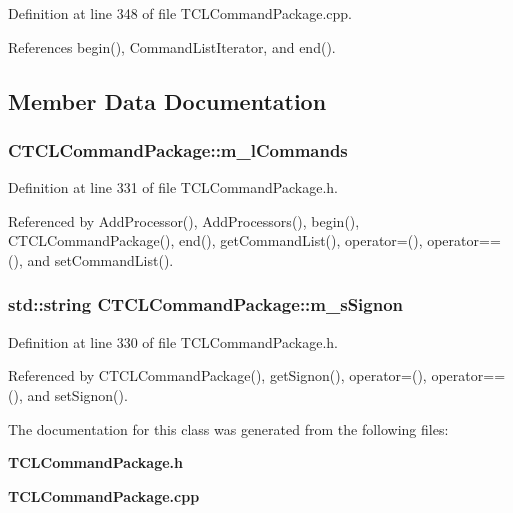 Definition at line 348 of file TCLCommand\-Package.cpp.

References begin(), Command\-List\-Iterator, and end().

\subsection{Member Data Documentation}
\subsubsection{ CTCLCommand\-Package::m\_\-l\-Commands\hspace{0.3cm}{\tt  [private]}}\label{classCTCLCommandPackage_o1}




Definition at line 331 of file TCLCommand\-Package.h.

Referenced by Add\-Processor(), Add\-Processors(), begin(), CTCLCommand\-Package(), end(), get\-Command\-List(), operator=(), operator==(), and set\-Command\-List().
\subsubsection{\setlength{\rightskip}{0pt plus 5cm}std::string CTCLCommand\-Package::m\_\-s\-Signon\hspace{0.3cm}{\tt  [private]}}\label{classCTCLCommandPackage_o0}




Definition at line 330 of file TCLCommand\-Package.h.

Referenced by CTCLCommand\-Package(), get\-Signon(), operator=(), operator==(), and set\-Signon().

The documentation for this class was generated from the following files:\begin{CompactItemize}
\item 
{\bf TCLCommand\-Package.h}\item 
{\bf TCLCommand\-Package.cpp}\end{CompactItemize}
